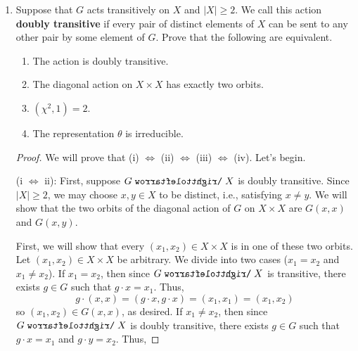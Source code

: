 \documentclass[../psets.tex]{subfiles}
\begin{document}
\begin{enumerate}
\begin{enumerate}
\begin{proof}
            Since $\rho$ is a permutational representation, we have that $\chi(g)=|\Fix_X(g)|$, where here we let $\Fix_X(g)=\{x\in X\mid g\cdot x=x\}$. It follows via a simple bidirectional inclusion proof that $\Fix_{X\times X}(g)=\Fix_X(g)\times\Fix_X(g)$. Thus,
            \begin{equation*}
                \chi_{X\times X}^{} = |\Fix_{X\times X}(g)|
                = |\Fix_X(g)\times\Fix_X(g)|
                = |\Fix_X(g)|^2
                = \chi^2
            \end{equation*}
            as desired.
        \end{proof}
        \item Suppose that $G$ acts transitively on $X$ and $|X|\geq 2$. We call this action \textbf{doubly transitive} if every pair of distinct elements of $X$ can be sent to any other pair by some element of $G$. Prove that the following are equivalent.
        \begin{enumerate}
            \item The action is doubly transitive.
            \item The diagonal action on $X\times X$ has exactly two orbits.
            \item $(\chi^2,1)=2$.
            \item The representation $\theta$ is irreducible.
        \end{enumerate}
        \begin{proof}
            We will prove that (i) $\Leftrightarrow$ (ii) $\Leftrightarrow$ (iii) $\Leftrightarrow$ (iv). Let's begin.\par\medskip
            (i $\Leftrightarrow$ ii): First, suppose $G\acts X$ is doubly transitive. Since $|X|\geq 2$, we may choose $x,y\in X$ to be distinct, i.e., satisfying $x\neq y$. We will show that the two orbits of the diagonal action of $G$ on $X\times X$ are $G(x,x)$ and $G(x,y)$.\par
            First, we will show that every $(x_1,x_2)\in X\times X$ is in one of these two orbits. Let $(x_1,x_2)\in X\times X$ be arbitrary. We divide into two cases ($x_1=x_2$ and $x_1\neq x_2$). If $x_1=x_2$, then since $G\acts X$ is transitive, there exists $g\in G$ such that $g\cdot x=x_1$. Thus,
            \begin{equation*}
                g\cdot(x,x) = (g\cdot x,g\cdot x) = (x_1,x_1) = (x_1,x_2)
            \end{equation*}
            so $(x_1,x_2)\in G(x,x)$, as desired. If $x_1\neq x_2$, then since $G\acts X$ is doubly transitive, there exists $g\in G$ such that $g\cdot x=x_1$ and $g\cdot y=x_2$. Thus,

\end{proof}
\end{enumerate}
\end{enumerate}
\end{document}
